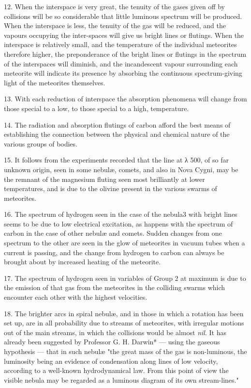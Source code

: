 \documentclass[a4paper, 12pt, oneside, polutonikogreek, english]{article}
\begin{document}
12. When the interspace is very great, the tenuity of the gases given off by collisions will be so considerable that little luminous spectrum will be produced. When the interspace is less, the tenuity of the gas will be reduced, and the vapours occupying the inter-spaces will give us bright lines or flutings. When the interspace is relatively small, and the temperature of the individual meteorites therefore higher, the preponderance of the bright lines or flutings in the spectrum of the interspaces will diminish, and the incandescent vapour surrounding each meteorite will indicate its presence by absorbing the continuous spectrum-giving light of the meteorites themselves.

13. With each reduction of interspace the absorption phenomena will change from those special to a low, to those special to a high, temperature.

14. The radiation and absorption flutings of carbon afford the best means of establishing the connection between the physical and chemical nature of the various groups of bodies.

15. It follows from the experiments recorded that the line at λ 500, of so far unknown origin, seen in some nebulæ, comets, and also in Nova Cygni, may be the remnant of the magnesium fluting seen most brilliantly at lower temperatures, and is due to the olivine present in the various swarms of meteorites.

16. The spectrum of hydrogen seen in the case of the nebula3 with bright lines seems to be due to low electrical excitation, as happens with the spectrum of carbon in the case of other nebulæ and comets. Sudden changes from one spectrum to the other are seen in the glow of meteorites in vacuum tubes when a current is passing, and the change from hydrogen to carbon can always be brought about by increased heating of the meteorite.

17. The spectrum of hydrogen seen in variables of Group 2 at maximum is due to the emission of that gas from the meteorites in the colliding swarms which encounter each other with the highest velocities.

18. The brighter arcs in spiral nebulæ, and in those in which a rotation has been set up, are in all probability due to streams of meteorites, with irregular motions out of the main streams, in which the collisions would be almost \emph{nil}. It has already been suggested by Professor G. H. Darwin* --- using the gaseous hypothesis --- that in such nebulæ "the great mass of the gas is non-luminous, the luminosity being an evidence of condensation along lines of low velocity, according to a well-known hydrodynamical law. From this point of view the visible nebula may be regarded as a luminous diagram of its own stream-lines."
\end{document}
